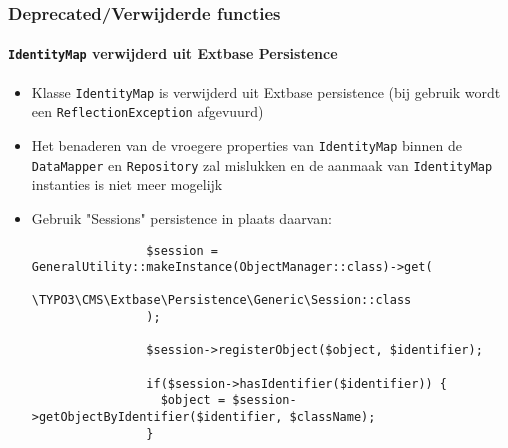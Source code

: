 
\begin{frame}[fragile]
	\frametitle{Deprecated/Verwijderde functies}
	\framesubtitle{\texttt{IdentityMap} verwijderd uit Extbase Persistence}

	\lstset{basicstyle=\tiny\ttfamily}

	\begin{itemize}

		\item Klasse \texttt{IdentityMap} is verwijderd uit Extbase persistence\newline
			\small(bij gebruik wordt een \texttt{ReflectionException} afgevuurd)\normalsize

		\item Het benaderen van de vroegere properties van \texttt{IdentityMap} binnen de
			\texttt{DataMapper} en \texttt{Repository} zal mislukken en de aanmaak van
			\texttt{IdentityMap} instanties is niet meer mogelijk

		\item Gebruik "Sessions" persistence in plaats daarvan:

			\begin{lstlisting}
				$session = GeneralUtility::makeInstance(ObjectManager::class)->get(
				  \TYPO3\CMS\Extbase\Persistence\Generic\Session::class
				);

				$session->registerObject($object, $identifier);

				if($session->hasIdentifier($identifier)) {
				  $object = $session->getObjectByIdentifier($identifier, $className);
				}
			\end{lstlisting}

	\end{itemize}

\end{frame}


